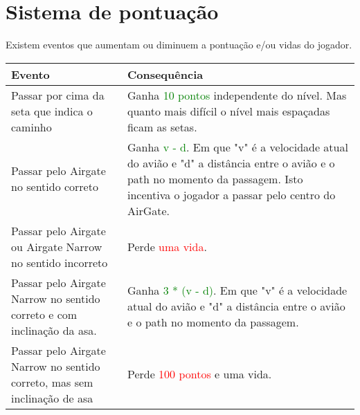 \section*{Sistema de pontuação}
Existem eventos que aumentam ou diminuem a pontuação e/ou vidas do jogador.

\begin{table}[h]
\centering
\begin{tabular}{|p{}|p{}|}
\hline
\textbf{Evento} & \textbf{Consequência} \\
\hline
\hspace{0.1cm}\vspace{0.1cm}Passar por cima da seta que indica o caminho & Ganha \textcolor{green}{10 pontos} independente do nível. Mas quanto mais difícil o nível mais espaçadas ficam as setas.\hspace{0.1cm}\vspace{0.1cm} \\
\hline
\hspace{0.1cm}\vspace{0.1cm}Passar pelo Airgate no sentido correto & Ganha \textcolor{green}{v - d}. Em que "v" é a velocidade atual do avião e "d" a distância entre o avião e o path no momento da passagem. Isto incentiva o jogador a passar pelo centro do AirGate.\hspace{0.1cm}\vspace{0.1cm} \\
\hline
\hspace{0.1cm}\vspace{0.1cm}Passar pelo Airgate ou Airgate Narrow no sentido incorreto & Perde \textcolor{red}{uma vida}.\hspace{0.1cm}\vspace{0.1cm} \\
\hline
\hspace{0.1cm}\vspace{0.1cm}Passar pelo Airgate Narrow no sentido correto e com inclinação da asa. & Ganha \textcolor{green}{3 * (v - d)}. Em que "v" é a velocidade atual do avião e "d" a distância entre o avião e o path no momento da passagem.\hspace{0.1cm}\vspace{0.1cm} \\
\hline
\hspace{0.1cm}\vspace{0.1cm}Passar pelo Airgate Narrow no sentido correto, mas sem inclinação de asa & Perde \textcolor{red}{100 pontos} e uma vida.\hspace{0.1cm}\vspace{0.1cm} \\

\end{tabular}
\end{table}

